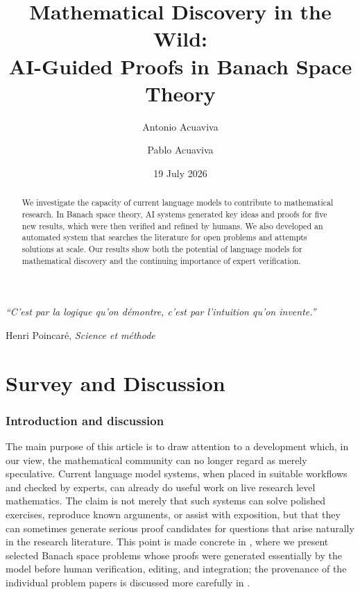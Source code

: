 \documentclass[11pt,reqno]{amsart}
\title[Mathematical Discovery in the Wild]{Mathematical Discovery in the Wild:\\ AI-Guided Proofs in Banach Space Theory}
\author[A. Acuaviva]{Antonio Acuaviva}
\author[P. Acuaviva]{Pablo Acuaviva}
\date{19 July 2026}
\let\standardtableofcontents\tableofcontents
\theoremstyle{plain}
\theoremstyle{definition}
\begin{document}
\begin{abstract}
    We investigate the capacity of current language models to contribute to mathematical research. In Banach space theory, AI systems generated key ideas and proofs for five new results, which were then verified and refined by humans. We also developed an automated system that searches the literature for open problems and attempts solutions at scale. Our results show both the potential of language models for mathematical discovery and the continuing importance of expert verification.
\end{abstract}


\maketitle

\begin{flushright}
\begin{minipage}{0.7\textwidth}
\itshape
``C'est par la logique qu'on démontre, c'est par l'intuition qu'on invente.''

\medskip
\upshape\hfill Henri Poincaré, \emph{Science et méthode}
\end{minipage}
\end{flushright}


\setcounter{tocdepth}{1}
\standardtableofcontents

\part{Survey and Discussion}\label{part1}

\section{Introduction and discussion}
\label{sec:introduction-discussion}

The main purpose of this article is to draw attention to a development which, in our view, the mathematical community can no longer regard as merely speculative. Current language model systems, when placed in suitable workflows and checked by experts, can already do useful work on live research level mathematics. The claim is not merely that such systems can solve polished exercises, reproduce known arguments, or assist with exposition, but that they can sometimes generate serious proof candidates for questions that arise naturally in the research literature. This point is made concrete in , where we present selected Banach space problems whose proofs were generated essentially by the model before human verification, editing, and integration; the provenance of the individual problem papers is discussed more carefully in .
\end{document}
